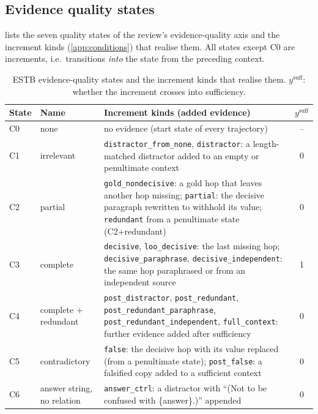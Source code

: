 \subsection{Evidence quality states}
\label{app:estb-quality}

 lists the seven quality states of the review's evidence-quality axis and the increment kinds (\cref{app:conditions}) that realise them. All states except C0 are increments, i.e.\ transitions \emph{into} the state from the preceding context.

\begin{table}[h]
\centering\scriptsize
\setlength{\tabcolsep}{3pt}
\begin{tabular}{llp{6.4cm}c}
\toprule
State & Name & Increment kinds (added evidence) & $y^{\mathrm{suff}}$ \\
\midrule
C0 & none & no evidence (start state of every trajectory) & -- \\
C1 & irrelevant & \texttt{distractor\_from\_none}, \texttt{distractor}: a length-matched distractor added to an empty or penultimate context & 0 \\
C2 & partial & \texttt{gold\_nondecisive}: a gold hop that leaves another hop missing; \texttt{partial}: the decisive paragraph rewritten to withhold its value; \texttt{redundant} from a penultimate state (C2+redundant) & 0 \\
C3 & complete & \texttt{decisive}, \texttt{loo\_decisive}: the last missing hop; \texttt{decisive\_paraphrase}, \texttt{decisive\_independent}: the same hop paraphrased or from an independent source & 1 \\
C4 & complete + redundant & \texttt{post\_distractor}, \texttt{post\_redundant}, \texttt{post\_redundant\_paraphrase}, \texttt{post\_redundant\_independent}, \texttt{full\_context}: further evidence added after sufficiency & 0 \\
C5 & contradictory & \texttt{false}: the decisive hop with its value replaced (from a penultimate state); \texttt{post\_false}: a falsified copy added to a sufficient context & 0 \\
C6 & answer string, no relation & \texttt{answer\_ctrl}: a distractor with ``(Not to be confused with \{answer\}.)'' appended & 0 \\
\bottomrule
\end{tabular}
\caption{ESTB evidence-quality states and the increment kinds that realise them. $y^{\mathrm{suff}}$: whether the increment crosses into sufficiency.}
\label{tab:estb-states}
\end{table}

